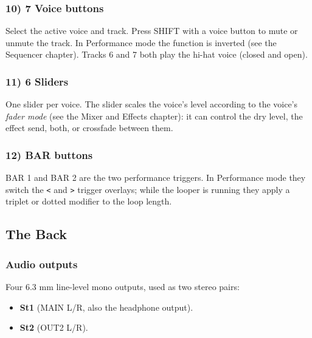 \subsubsection{10) 7 Voice buttons}\label{voice-buttons}

Select the active voice and track. Press SHIFT with a voice button to
mute or unmute the track. In Performance mode the function is inverted
(see the Sequencer chapter). Tracks 6 and 7 both play the hi-hat voice
(closed and open).

\subsubsection{11) 6 Sliders}\label{sliders}

One slider per voice. The slider scales the voice's level according to
the voice's \emph{fader mode} (see the Mixer and Effects chapter): it
can control the dry level, the effect send, both, or crossfade between
them.

\subsubsection{12) BAR buttons}\label{bar-buttons}

BAR 1 and BAR 2 are the two performance triggers. In Performance mode
they switch the \texttt{\textless{}} and \texttt{\textgreater{}} trigger
overlays; while the looper is running they apply a triplet or dotted
modifier to the loop length.

\subsection{The Back}\label{the-back}


\subsubsection{Audio outputs}\label{audio-outputs}

Four 6.3 mm line-level mono outputs, used as two stereo pairs:

\begin{itemize}
\tightlist
\item
  \textbf{St1} (MAIN L/R, also the headphone output).
\item
  \textbf{St2} (OUT2 L/R).
\end{itemize}

